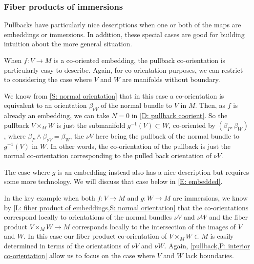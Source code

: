 \subsubsection{Fiber products of immersions}\label{S: co-or product immersion}

Pullbacks have particularly nice descriptions when one or both of the maps are embeddings or immersions.
In addition, these special cases are good for building intuition about the more general situation.

\begin{example}\label{E: V embedded}
	When $f \colon V \to M$ is a co-oriented embedding, the pullback co-orientation is particularly easy to describe. Again, for co-orientation purposes, we can restrict to considering the case where $V$ and $W$ are manifolds without boundary.

	We know from \cref{S: normal orientation} that in this case a co-orientation is equivalent to an orientation $\beta_{\nu V}$ of the normal bundle to $V$ in $M$.
	Then, as $f$ is already an embedding, we can take $N = 0$ in \cref{D: pullback coorient}.
	So the pullback $V \times_M W$ is just the submanifold $g^{-1}(V) \subset W$, co-oriented by $(\beta_P,\beta_W)$, where $\beta_P \wedge \beta_{\nu V} = \beta_W$, the $\nu V$ here being the pullback of the normal bundle to $g^{-1}(V)$ in $W$.
	In other words, the co-orientation of the pullback is just the normal co-orientation corresponding to the pulled back orientation of $\nu V$.

	The case where $g$ is an embedding instead also has a nice description but requires some more technology.
	We will discuss that case below in \cref{E: embedded}.
\end{example}

In the key example when both $f \colon V \to M$ and $g \colon W \to M$ are immersions, we know by \cref{L: fiber product of embeddings,S: normal orientation} that the co-orientations correspond locally to orientations of the normal bundles $\nu V$ and $\nu W$ and the fiber product $V \times_M W \to M$ corresponds locally to the intersection of the images of $V$ and $W$.
In this case our fiber product co-orientation of $V \times_M W \subset M$ is easily determined in terms of the orientations of $\nu V$ and $\nu W$. 
Again, \cref{pullback,P: interior co-orientation} allow us to focus on the case where $V$ and $W$ lack boundaries.

